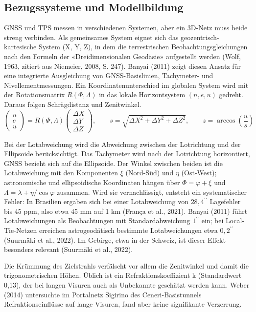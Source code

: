 \subsection{Bezugssysteme und Modellbildung}
\label{sec:Bezugssysteme und Modellbildung}
GNSS und TPS messen in verschiedenen Systemen, aber ein 3D-Netz muss beide streng verbinden. 
Als gemeinsames System eignet sich das geozentrisch-kartesische System (X, Y, Z), in dem die terrestrischen Beobachtungsgleichungen nach den Formeln der «Dreidimensionalen Geodäsie» aufgestellt werden (Wolf, 1963, zitiert aus Niemeier, 2008, S. 247). 
Banyai (2011) zeigt diesen Ansatz für eine integrierte Ausgleichung von GNSS-Basislinien, Tachymeter- und Nivellementmessungen.
Ein Koordinatenunterschied im globalen System wird mit der Rotationsmatrix \(R(\Phi, \Lambda)\) in das lokale Horizontsystem \((n, e, u)\) gedreht. Daraus folgen Schrägdistanz und Zenitwinkel.
\[
\begin{pmatrix} n \\ e \\ u \end{pmatrix} = R(\Phi, \Lambda)\begin{pmatrix} \Delta X \\ \Delta Y \\ \Delta Z \end{pmatrix}, \qquad s = \sqrt{\Delta X^2 + \Delta Y^2 + \Delta Z^2}, \qquad z = \arccos\left(\frac{u}{s}\right)
\]

Bei der Lotabweichung wird die Abweichung zwischen der Lotrichtung und der Ellipsoide berücksichtigt. 
Das Tachymeter wird nach der Lotrichtung horizontiert, GNSS bezieht sich auf die Ellipsoide. Der Winkel zwischen beiden ist die Lotabweichung mit den Komponenten \(\xi\) (Nord-Süd) und \(\eta\) (Ost-West); astronomische und ellipsoidische Koordinaten hängen über \(\Phi = \varphi + \xi\) und \(\Lambda = \lambda + \eta / \cos\varphi\) zusammen.
Wird sie vernachlässigt, entsteht ein systematischer Fehler: In Brasilien ergaben sich bei einer Lotabweichung von $28{,}4^{\prime\prime}$ Lagefehler bis 45 ppm, also etwa 45 mm auf 1 km (França et al., 2021).
Banyai (2011) führt Lotabweichungen als Beobachtungen mit Standardabweichung $1^{\prime\prime}$ ein; bei Local-Tie-Netzen erreichen astrogeodätisch bestimmte Lotabweichungen etwa $0{,}2^{\prime\prime}$ (Suurmäki et al., 2022).
Im Gebirge, etwa in der Schweiz, ist dieser Effekt besonders relevant (Suurmäki et al., 2022). \bigskip 

Die Krümmung des Zielstrahls verfälscht vor allem die Zenitwinkel und damit die trigonometrischen Höhen.
Üblich ist ein Refraktionskoeffizient k (Standardwert 0,13), der bei langen Visuren auch als Unbekannte geschätzt werden kann. 
Weber (2014) untersuchte im Portalnetz Sigirino des Ceneri-Basistunnels Refraktionseinflüsse auf lange Visuren, fand aber keine signifikante Verzerrung. \bigskip 


